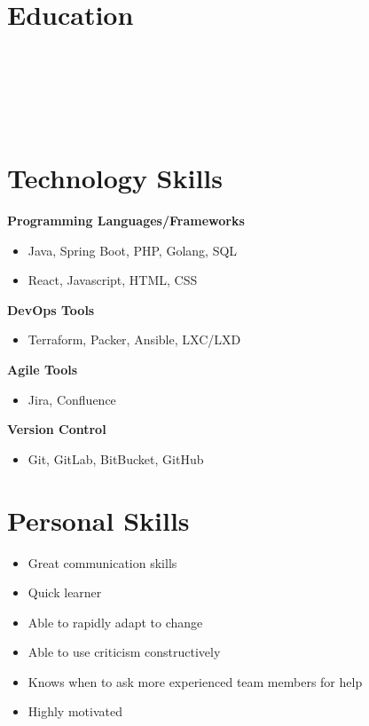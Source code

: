 \documentclass[a4paper]{cv}
\begin{document}
\hspace{0.2cm}
{\color{headings}\vrule}
\hspace{0.2cm}
\begin{minipage}[t]{0.41\textwidth}
\section{Education}
\\
\sectionspace

\\
\sectionspace

\\
\section{Technology Skills}
\textbf{Programming Languages/Frameworks}
\begin{itemize}
    \item Java, Spring Boot, PHP, Golang, SQL
\end{itemize}
\begin{itemize}
    \item React, Javascript, HTML, CSS
\end{itemize}
\textbf{DevOps Tools}
\begin{itemize}
    \item Terraform, Packer, Ansible, LXC/LXD
\end{itemize}
\textbf{Agile Tools}
\begin{itemize}
    \item Jira, Confluence
\end{itemize}
\textbf{Version Control}
\begin{itemize}
    \item Git, GitLab, BitBucket, GitHub
\end{itemize}

\section{Personal Skills}
\begin{itemize}
    \item Great communication skills
    \item Quick learner
    \item Able to rapidly adapt to change
    \item Able to use criticism constructively
    \item Knows when to ask more experienced team members for help
    \item Highly motivated
\end{itemize}
\end{minipage}
\end{document}

